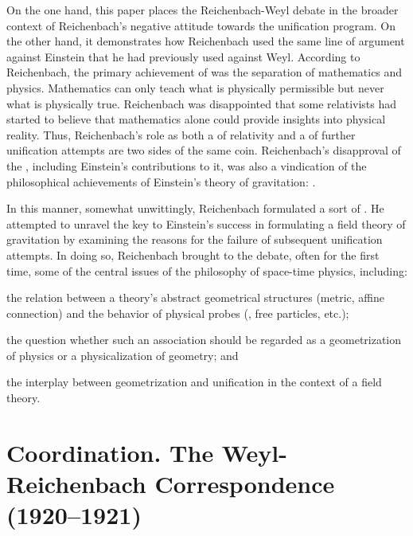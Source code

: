 \documentclass[final]{article}
\begin{document}
On the one hand, this paper places the Reichenbach-Weyl debate in the broader context of Reichenbach's negative attitude towards the unification program. On the other hand, it demonstrates how Reichenbach used the same line of argument against Einstein that he had previously used against Weyl. According to Reichenbach, the primary achievement of \gr was the separation of mathematics and physics. Mathematics can only teach what is physically permissible but never what is physically true. Reichenbach was disappointed that some relativists had started to believe that mathematics alone could provide insights into physical reality. Thus, Reichenbach's role as both a  of relativity and a  of further unification attempts are two sides of the same coin. Reichenbach's disapproval of the \uftp, including Einstein's contributions to it, was also a vindication of the philosophical achievements of Einstein's theory of gravitation:  \citep[11]{Reichenbach1929}.  

In this manner, somewhat unwittingly, Reichenbach formulated a sort of  \citep{Lehmkuhl2017}. He attempted to unravel the key to Einstein's success in formulating a field theory of gravitation by examining the reasons for the failure of subsequent unification attempts. In doing so, Reichenbach brought to the debate, often for the first time, some of the central issues of the philosophy of space-time physics, including: \begin{inparaenum}[(a)] \item the relation between a theory's abstract geometrical structures (metric, affine connection) and the behavior of physical probes (\rac, free particles, etc.); \item the question whether such an association should be regarded as a geometrization of physics or a physicalization of geometry; and \item the interplay between geometrization and unification in the context of a field theory. \end{inparaenum} 

\section{Coordination. The Weyl-Reichenbach Correspondence (1920--1921)}
\label{Coordination}
\end{document}
